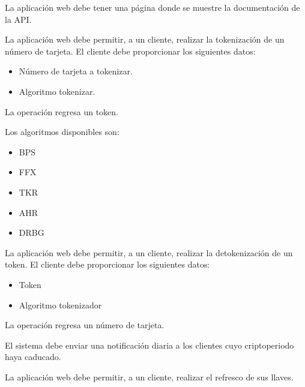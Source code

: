 {
  La aplicación web debe tener una página donde se muestre la documentación de la
  API.
}

{
  La aplicación web debe permitir, a un cliente, realizar la tokenización de un
  número de tarjeta. El cliente debe proporcionar los siguientes datos:
  \begin{itemize}
    \item Número de tarjeta a tokenizar.
    \item Algoritmo tokenizar.
  \end{itemize}
  La operación regresa un token.

  Los algoritmos disponibles son:
  \begin{itemize}
    \item BPS
    \item FFX
    \item TKR
    \item AHR
    \item DRBG
  \end{itemize}
}

{
  La aplicación web debe permitir, a un cliente, realizar la detokenización de
  un token. El cliente debe proporcionar los siguientes datos:
  \begin{itemize}
    \item Token
    \item Algoritmo tokenizador
  \end{itemize}
  La operación regresa un número de tarjeta.
}

{
  El sistema debe enviar una notificación diaria a los clientes cuyo
  criptoperiodo haya caducado.
}

{
  La aplicación web debe permitir, a un cliente, realizar el refresco de sus
  llaves.
}
